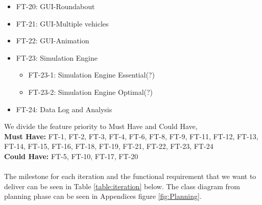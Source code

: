 \documentclass[11pt]{article}
\begin{document}
\begin{itemize}[noitemsep]
    	\item FT-20: GUI-Roundabout
    	\item FT-21: GUI-Multiple vehicles
    	\item FT-22: GUI-Animation
    	\item FT-23: Simulation Engine
    	    \begin{itemize}
        	\item FT-23-1: Simulation Engine Essential(?)
        	\item FT-23-2: Simulation Engine Optimal(?)
        	\end{itemize}
    	\item FT-24: Data Log and Analysis
   \end{itemize}

\noindent We divide the feature priority to Must Have and Could Have, 
\\
\textbf{Must Have:} FT-1, FT-2, FT-3, FT-4, FT-6, FT-8, FT-9, FT-11, FT-12, FT-13, FT-14, FT-15, FT-16, FT-18, FT-19, FT-21, FT-22, FT-23, FT-24
\\
\textbf{Could Have:} FT-5, FT-10, FT-17, FT-20
\\ \\
The milestone for each iteration and the functional requirement that we want to deliver can be seen in Table \ref{table:iteration} below. The class diagram from planning phase can be seen in Appendices figure \ref{fig:Planning}.
\end{document}
